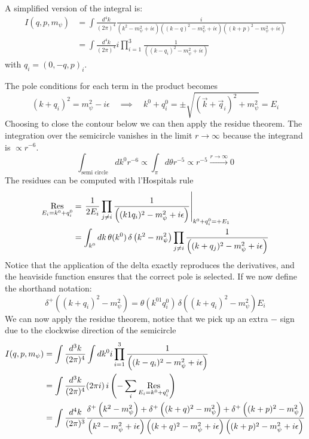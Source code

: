 A simplified version of the integral is:
\begin{align}
I(q,p,m_\psi)&=\int\frac{d^4k}{(2\pi)^4}
\frac{i}{\left(k^2-m_\psi^2+i\epsilon\right)\left((k-q)^2-m_\psi^2+i\epsilon\right)\left((k+p)^2-m_\psi^2+i\epsilon\right)}\\
&=\int\frac{d^4k}{(2\pi)^4}
i\prod_{i=1}^{3}\frac{1}{\left((k-q_i)^2-m_\psi^2+i\epsilon\right)}
\end{align}
with $q_i = (0,-q,p)_i$.

The pole conditions for each term in the product becomes
\begin{equation}
(k+q_i)^2 = m_\psi^2-i\epsilon \quad\implies\quad k^0+q_i^0 = \pm\sqrt{(\vec{k}+\vec{q}_i)^2+m_\psi^2} = E_i
\end{equation}
Choosing to close the contour below we can then apply the residue theorem.
The integration over the semicircle vanishes in the limit $r\to\infty$ because the integrand is $\propto r^{-6}$.
\begin{equation}
    \int_{\text{semi circle}} dk^0 r^{-6} \propto \int_{\pi} d\theta r^{-5} \propto r^{-5} \overset{r\to\infty}{\longrightarrow} 0
\end{equation}
The residues can be computed with l'Hospitals rule
\begin{align}
\Op{Res}_{E_i=k^0+q_i^0}
    &= \left. \frac{1}{2 E_i} \prod_{j\neq i} \frac{1}{ \left((k1q_i)^2-m_\psi^2+i\epsilon\right)} \right|_{k^0+q_i^0 = +E_1}\\
    &= \int_{k^0} d k \, \theta(k^0) \, \delta\left(k^2 - m_\psi^2\right) \prod_{j\neq i}\frac{1}{\left((k+q_j)^2-m_\psi^2+i\epsilon\right)}
\end{align}
Notice that the application of the delta exactly reproduces the derivatives, and the heaviside function ensures that the correct pole is selected.
If we now define the shorthand notation:
\begin{equation}
    \delta^{+}\left((k+q_i)^2 - m_\psi^2 \right) = \theta(k^01q_i^0) \, \delta\left((k+q_i)^2 - m_\psi^2\right) E_i
\end{equation}
We can now apply the residue theorem, notice that we pick up an extra $-$ sign due to the clockwise direction of the semicircle
\begin{align*}
   I(q,p,m_\psi) &= \int\frac{d^3k}{(2\pi)^4} \int dk^0 i \prod_{i=1}^{3}\frac{1}{\left((k-q_i)^2-m_\psi^2+i\epsilon\right)}\\
    &= \int\frac{d^3k}{(2\pi)^4} (2\pi i) \, i \left( - \sum_i \Op{Res}_{E_i=k^0+q_i^0} \right)\\
    &= \int\frac{d^4k}{(2\pi)^3}
\frac{\delta^{+}\left( k^2 - m_\psi^2 \right)+\delta^{+}\left( (k+q)^2 - m_\psi^2 \right)+\delta^{+}\left( (k+p)^2 - m_\psi^2 \right)}{\left(k^2-m_\psi^2+i\epsilon\right)\left((k+q)^2-m_\psi^2+i\epsilon\right)\left((k+p)^2-m_\psi^2+i\epsilon\right)}
\end{align*}
